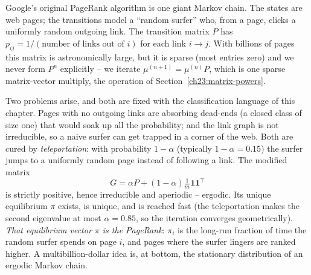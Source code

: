 \begin{applicationbox}
Google's original PageRank algorithm is one giant Markov chain. The states are web pages; the
transitions model a ``random surfer'' who, from a page, clicks a uniformly random outgoing
link. The transition matrix $P$ has $p_{ij} = 1/(\text{number of links out of } i)$ for each
link $i \to j$. With billions of pages this matrix is astronomically large, but it is sparse
(most entries zero) and we never form $P^n$ explicitly -- we iterate $\mu^{(n+1)} =
\mu^{(n)}P$, which is one sparse matrix-vector multiply, the operation of
Section~\ref{ch23:matrix-powers}.

Two problems arise, and both are fixed with the classification language of this chapter. Pages
with no outgoing links are absorbing dead-ends (a closed class of size one) that would soak up
all the probability; and the link graph is not irreducible, so a naive surfer can get trapped in
a corner of the web. Both are cured by \emph{teleportation}: with probability $1 - \alpha$
(typically $1-\alpha = 0.15$) the surfer jumps to a uniformly random page instead of following a
link. The modified matrix
\[
  G = \alpha P + (1-\alpha)\tfrac{1}{m}\mathbf{1}\mathbf{1}^{\!\top}
\]
is strictly positive, hence irreducible and aperiodic -- ergodic. Its unique equilibrium $\pi$
exists, is unique, and is reached fast (the teleportation makes the second eigenvalue at most
$\alpha = 0.85$, so the iteration converges geometrically). \emph{That equilibrium vector
$\pi$ is the PageRank}: $\pi_i$ is the long-run fraction of time the random surfer spends on
page $i$, and pages where the surfer lingers are ranked higher. A multibillion-dollar idea is,
at bottom, the stationary distribution of an ergodic Markov chain.
\end{applicationbox}

